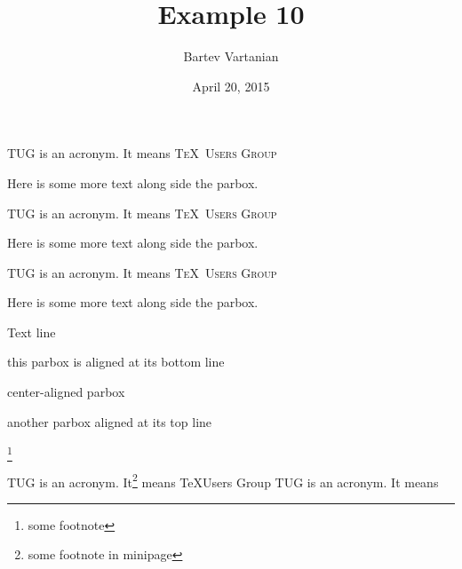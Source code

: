 \documentclass{article}
\newcommand{\TUG}{\textsc{\TeX\ Users Group}\xspace}
\begin{document}
\title{Example 10}
\author{Bartev Vartanian}
\date{April 20, 2015}

\maketitle

\parbox{3cm}{TUG is an acronym. It means \TUG}
Here is some more text along side the parbox.



\parbox[b]{3cm}{TUG is an acronym. It means \TUG}
Here is some more text along side the parbox.



\parbox[t]{3cm}{TUG is an acronym. It means \TUG}
Here is some more text along side the parbox.


Text line
\quad\parbox[b]{1.8cm}{this parbox is aligned at its bottom line}
\quad\parbox{1.5cm}{center-aligned parbox}
\quad\parbox[t]{2cm}{another parbox aligned at its top line}

\footnote{some footnote}

\begin{minipage}{3cm}
TUG is an acronym. It\footnote{some footnote in minipage} means \TeX Users Group TUG is an acronym. It means
\end{minipage}
\end{document}
